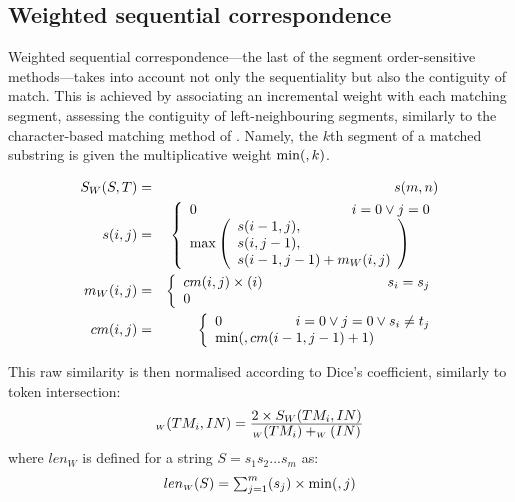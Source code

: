 \subsection*{Weighted sequential correspondence}

Weighted sequential correspondence---the last of the segment
order-sensitive methods---takes into account not only the sequentiality
but also the contiguity of match. This is achieved by associating an
incremental weight with each matching segment, assessing the contiguity
of left-neighbouring segments, similarly to the character-based matching
method of . Namely, the $k$th segment of a matched
substring is given the multiplicative weight $\min(,k)$.


\begin{eqnarray}
  S_W(S,T) & = & s(m,n)\\
  s(i,j) & = & \left\{
    \begin{array}{l}
      0 \hfill\mathit{if}\; i=0\vee j=0\\
      \max\left(
        \begin{array}{l}
          s(i-1,j),\\
          s(i,j-1),\\
          s(i-1,j-1)+m_W(i,j)
        \end{array}
      \right)\hspace*{5mm}\hfill\mathit{otherwise}
    \end{array}
  \right.\\
  m_W(i,j) & = & \left\{
    \begin{array}{l}
      cm(i,j)\times\sweight(i) \hspace*{30.5mm} \hfill\mathit{if}\;s_i=s_j\\
      0\hfill\mathit{otherwise}
    \end{array}
  \right.\\
  cm(i,j) & = & \left\{
    \begin{array}{l}
      0\hfill\mathit{if}\;i=0\vee j=0\vee s_i\ne t_j\\
      \min(\Max,cm(i-1,j-1)+1)\hspace*{14mm} \hfill\mathit{otherwise}
    \end{array}
  \right.
\end{eqnarray}

This raw similarity is then normalised according to Dice's coefficient,
similarly to token intersection:
\begin{equation}
  \textstyle
  \label{eq:wsc}
  \mathit{sim}_{\scriptscriptstyle W}(TM_i,IN) = 
  \frac{\textstyle
    2\times S_W(TM_i,IN)}{\textstyle \len_{\scriptscriptstyle W}(TM_i)+\len_{\scriptscriptstyle W}(IN)}
\end{equation}
where $len_{\scriptscriptstyle W}$ is defined for a string
$S=s_1 s_2 ... s_m$ as:
\begin{equation} \textstyle
  \label{eq:wseqcorrlen}
  len_{\scriptscriptstyle W}(S) = \sum_{j=1}^m \sweight(s_j)\times\min(\Max,j) 
\end{equation}




